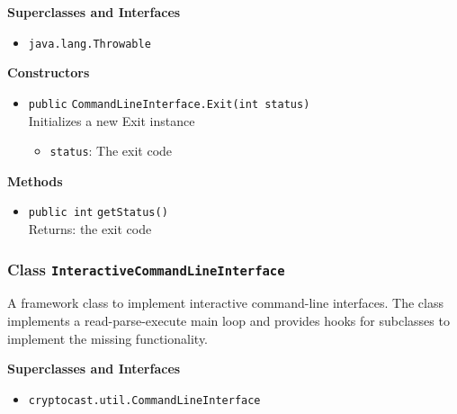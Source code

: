 \textbf{Superclasses and Interfaces}
\begin{itemize}
\item \lstinline|java.lang.Throwable|
\end{itemize}



\textbf{Constructors}
\begin{itemize}
\item \lstinline|public| \lstinline|CommandLineInterface.Exit|\lstinline|(int status)|\\
Initializes a new Exit instance
\begin{itemize}
\item \lstinline|status|: The exit code
\end{itemize}



\end{itemize}


\textbf{Methods}
\begin{itemize}
\item \lstinline|public int| \lstinline|getStatus|\lstinline|()|\\
Returns: the exit code



\end{itemize}

\subsubsection{Class \lstinline|InteractiveCommandLineInterface|}
A framework class to implement interactive command-line interfaces. The class implements
 a read-parse-execute main loop and provides hooks for subclasses to implement the missing
 functionality. \\



\textbf{Superclasses and Interfaces}
\begin{itemize}
\item \lstinline|cryptocast.util.CommandLineInterface|
\end{itemize}



